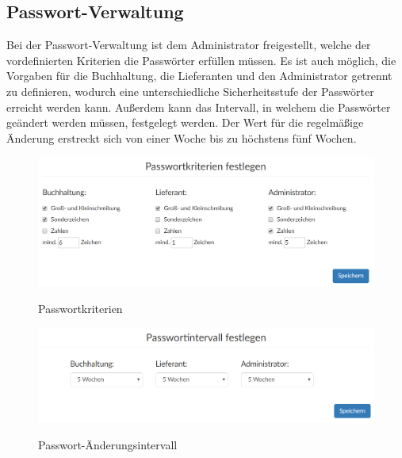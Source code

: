 \subsection{Passwort-Verwaltung}
Bei der Passwort-Verwaltung ist dem Administrator freigestellt, welche der vordefinierten Kriterien die Passwörter erfüllen müssen. Es ist auch möglich, die Vorgaben für die Buchhaltung, die Lieferanten und den Administrator getrennt zu definieren, wodurch eine unterschiedliche Sicherheitsstufe der Passwörter erreicht werden kann. Außerdem kann das Intervall, in welchem die Passwörter geändert werden müssen, festgelegt werden. Der Wert für die regelmäßige Änderung erstreckt sich von einer Woche bis zu höchstens fünf Wochen.
\begin{figure}[!h]
    \centering
    \includegraphics[width=15cm]{figures/kriterien.png}
    \label{fig:passwortkriterien}
    \caption{Passwortkriterien}
\end{figure}
\begin{figure}[!h]
    \centering
    \includegraphics[width=15cm]{figures/intervall.png}
    \label{fig:passwortintervall}
    \caption{Passwort-Änderungsintervall}
\end{figure}
\newpage
